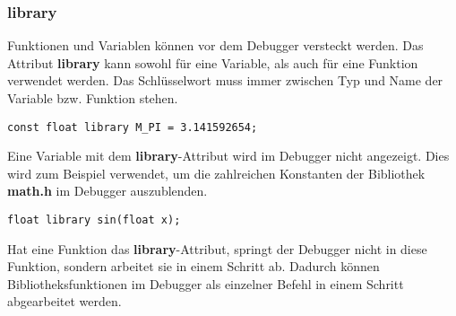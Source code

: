\subsubsection*{library}
Funktionen und Variablen können vor dem Debugger \glqq{}versteckt\grqq{} werden. Das Attribut \textbf{library} kann sowohl für eine Variable, als auch für eine Funktion verwendet werden. Das Schlüsselwort muss immer zwischen Typ und Name der Variable bzw. Funktion stehen.

\begin{lstlisting}[language=CMM]
const float library M_PI = 3.141592654;
\end{lstlisting}
Eine Variable mit dem \textbf{library}-Attribut wird im Debugger nicht angezeigt. Dies wird zum Beispiel verwendet, um die zahlreichen Konstanten der Bibliothek \textbf{math.h} im Debugger auszublenden.

\begin{lstlisting}[language=CMM]
float library sin(float x);
\end{lstlisting}
Hat eine Funktion das \textbf{library}-Attribut, springt der Debugger nicht in diese Funktion, sondern arbeitet sie in einem Schritt ab. Dadurch können Bibliotheksfunktionen im Debugger als einzelner Befehl in einem Schritt abgearbeitet werden.
